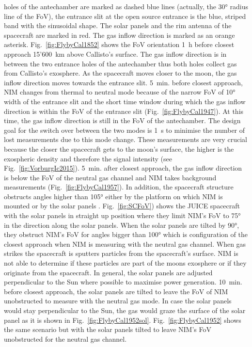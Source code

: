 	holes of the antechamber are marked as dashed blue lines (actually, the 30° radius line of the FoV), the entrance slit at the open source entrance is the blue, striped band with the sinusoidal shape. The solar panels and the rim antenna of the spacecraft are marked in red. The gas inflow direction is marked as an orange asterisk. Fig.~\ref{fig:FlybyCal1852} shows the FoV orientation 1~h before closest approach 15'600~km above Callisto's surface. The gas inflow direction is in between the two entrance holes of the antechamber thus both holes collect gas from Callisto's exosphere. As the spacecraft moves closer to the moon, the gas inflow direction moves towards the entrance slit. 5~min. before closest approach, NIM changes from thermal to neutral mode because of the narrow FoV of 10° width of the entrance slit and the short time window during which the gas inflow direction is within the FoV of the entrance slit (Fig.~\ref{fig:FlybyCal1947}). At this time, the gas inflow direction is still in the FoV of the antechamber. The design goal for the switch over between the two modes is 1~s to minimise the number of lost measurements due to this mode change. These measurements are very crucial because the closer the spacecraft gets to the moon's surface, the higher is the exospheric density and therefore the signal intensity (see Fig.~\ref{fig:VorburgIc2015}). 5~min. after closest approach, the gas inflow direction is below the FoV of the neutral gas channel and NIM takes background measurements (Fig.~\ref{fig:FlybyCal1957}). In addition, the spacecraft structure obstructs angles higher than 105° either by the platform on which NIM is mounted or by the solar panels \cite{NIM_FoV}. Fig.~\ref{fig:SCFoV}) shows the JUICE spacecraft with the solar panels in straight up position where they limit NIM's FoV to 75° in the direction along the solar panels. When the solar panels are tilted by 90°, they obstruct NIM's FoV for angles bigger than 100° which is configuration of the closest approach when NIM is measuring with the neutral gas channel. When gas strikes the spacecraft is sputters particles from the spacecraft's surface. NIM is not able to determine if these particles are part of the moons exosphere or if they originate from the spacecraft. In general, the solar panels are adjusted perpendicular to the Sun where possible to maximise power generation. 10~min. before closest approach, the solar panels are tilted to leave the FoV of NIM unobstructed to measure with the neutral gas mode. In case the solar panels would stay perpendicular to the Sun, the gas would graze the surface of the solar panel as it is shown in Fig.~\ref{fig:FlybyCal1952sol}. Fig.~\ref{fig:FlybyCal1952} shows the same scenario but with the solar panels tilted to leave NIM's FoV unobstructed for the neutral gas channel.\\
